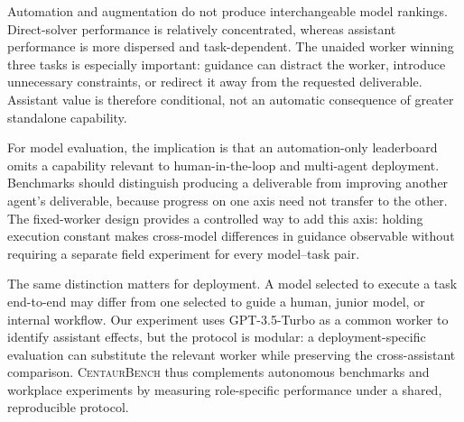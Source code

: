 Automation and augmentation do not produce interchangeable model rankings.
Direct-solver performance is relatively concentrated, whereas assistant
performance is more dispersed and task-dependent. The unaided worker winning
three tasks is especially important: guidance can distract the worker,
introduce unnecessary constraints, or redirect it away from the requested
deliverable. Assistant value is therefore conditional, not an automatic
consequence of greater standalone capability.

For model evaluation, the implication is that an automation-only leaderboard
omits a capability relevant to human-in-the-loop and multi-agent deployment.
Benchmarks should distinguish producing a deliverable from improving another
agent's deliverable, because progress on one axis need not transfer to the
other. The fixed-worker design provides a controlled way to add this axis:
holding execution constant makes cross-model differences in guidance
observable without requiring a separate field experiment for every
model--task pair.

The same distinction matters for deployment. A model selected to execute a
task end-to-end may differ from one selected to guide a human, junior model,
or internal workflow. Our experiment uses GPT-3.5-Turbo as a common worker to
identify assistant effects, but the protocol is modular: a deployment-specific
evaluation can substitute the relevant worker while preserving the
cross-assistant comparison. \textsc{CentaurBench} thus complements autonomous
benchmarks and workplace experiments by measuring role-specific performance
under a shared, reproducible protocol.
